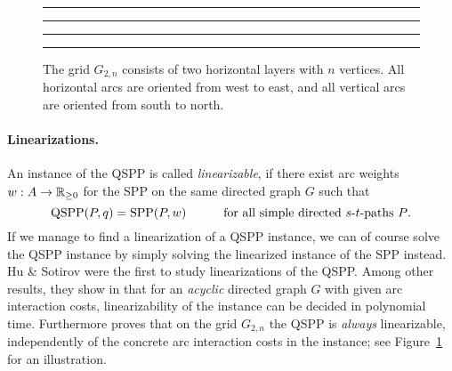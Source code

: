 \documentclass[11pt,fleqn]{article}
\begin{document}
\begin{figure}[b]
\hrule\hrule
\medskip
\bigskip
\begin{center}
\end{center}
\caption{The grid $G_{2,n}$ consists of two horizontal layers with $n$ vertices.
All horizontal arcs are oriented from west to east, and all vertical arcs are oriented from south to north.}
\label{fig:grid}
\bigskip
\hrule\hrule
\end{figure}

\paragraph{Linearizations.}
An instance of the QSPP is called \emph{linearizable}, if there exist arc weights $w:A\to{\mathbb{R}_{\ge0}}$
for the SPP on the same directed graph $G$ such that
\begin{equation}
\label{eq:linearizable}
\text{QSPP}(P,q) = \text{SPP}(P,w) \text{\qquad\quad for all simple directed $s$-$t$-paths $P$.}
\end{equation}
If we manage to find a linearization of a QSPP instance, we can of course solve the QSPP instance
by simply solving the linearized instance of the SPP instead.
Hu \& Sotirov \cite{HuSo2018a,HuSo2018b} were the first to study linearizations of the QSPP.
Among other results, they show in \cite{HuSo2018b} that for an \emph{acyclic} directed graph $G$
with given arc interaction costs, linearizability of the instance can be decided in polynomial time.
Furthermore \cite{HuSo2018a} proves that on the grid $G_{2,n}$ the QSPP is \emph{always} linearizable,
independently of the concrete arc interaction costs in the instance;
see Figure~\ref{fig:grid} for an illustration.
\end{document}
